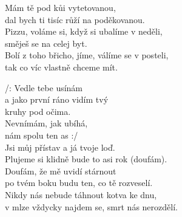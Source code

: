 
\ve{}
Mám tě pod kůi vytetovanou,\\
dal bych ti tisíc růží na poděkovanou.\\
Pizzu, voláme si, když si ubalíme v neděli,\\
směješ se na celej byt.\\
Bolí z toho břicho, jíme, válíme se v posteli,\\
tak co víc vlastně chceme mít.

\cho{}
/: Vedle tebe usínám\\
a jako první ráno vidím tvý\\
kruhy pod očima.\\
Nevnímám, jak ubíhá,\\
nám spolu ten as :/\\

\ve{}
Jsi můj přístav a já tvoje loď.\\
Plujeme si klidně bude to asi rok (doufám).\\
Doufám, že mě uvidí stárnout\\
po tvém boku budu ten, co tě rozveselí.\\
Nikdy nás nebude táhnout kotva ke dnu,\\
v mlze vždycky najdem se, smrt nás nerozdělí.


\esong